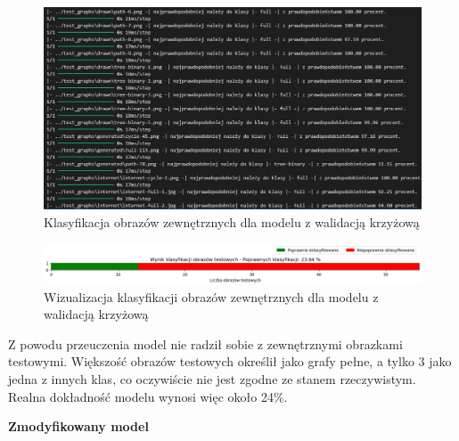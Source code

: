 \begin{figure}[ht]
	\centering
	\includegraphics[width=14cm]{resources/tests/images/v3/crossvalid_txt.png}
	\caption{Klasyfikacja obrazów zewnętrznych dla modelu z walidacją krzyżową}
	\label{Fig:tests-cv-0b}
\end{figure}
\FloatBarrier

\begin{figure}[ht]
	\centering
	\includegraphics[width=14cm]{resources/tests/images/v3/crossvalid_bar.png}
	\caption{Wizualizacja klasyfikacji obrazów zewnętrznych dla modelu z walidacją krzyżową}
	\label{Fig:tests-cv-0c}
\end{figure}
\FloatBarrier

Z powodu przeuczenia model nie radził sobie z zewnętrznymi obrazkami testowymi.
Większość obrazów testowych określił jako grafy pełne, a tylko 3 jako jedna z innych klas,
co oczywiście nie jest zgodne ze stanem rzeczywistym.
Realna dokładność modelu wynosi więc około 24\%.

\textbf{Zmodyfikowany model}

